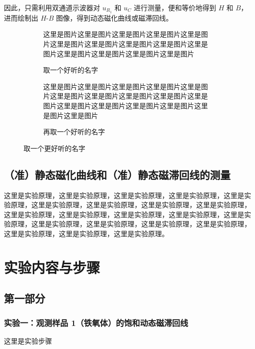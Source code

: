 \documentclass[UTF8]{article}
\theoremstyle{MyLineTheoremStyle} %
\theoremstyle{MyBlockTheoremStyle} %
\theoremstyle{MySubsubsectionStyle} %
\begin{document}
因此，只需利用双通道示波器对 $u_{R_1}$ 和 $u_C$ 进行测量，便和等价地得到 $H$ 和 $B$，进而绘制出 $H$-$B$ 图像，得到动态磁化曲线或磁滞回线。

\begin{figure}[H]\centering
\begin{subfigure}[b]{0.48\columnwidth}\centering
    这里是图片这里是图片这里是图片这里是图片这里是图片这里是图片这里是图片这里是图片这里是图片这里是图片这里是图片这里是图片这里是图片这里是图片
    \caption{取一个好听的名字}
\end{subfigure}\hfill
\begin{subfigure}[b]{0.48\columnwidth}\centering
    这里是图片这里是图片这里是图片这里是图片这里是图片这里是图片这里是图片这里是图片这里是图片这里是图片这里是图片这里是图片这里是图片这里是图片这里是图片这里是图片
    \caption{再取一个好听的名字}
\end{subfigure}
\caption{取一个更好听的名字}
\end{figure}



\subsection{（准）静态磁化曲线和（准）静态磁滞回线的测量}

这里是实验原理，这里是实验原理，这里是实验原理，这里是实验原理，这里是实验原理，这里是实验原理，这里是实验原理，这里是实验原理，这里是实验原理，这里是实验原理，这里是实验原理，这里是实验原理，这里是实验原理，这里是实验原理，这里是实验原理，这里是实验原理，这里是实验原理，这里是实验原理，这里是实验原理，这里是实验原理，这里是实验原理。


\section{实验内容与步骤}

\subsection{第一部分}

\subsubsection{实验一：观测样品 1（铁氧体）的饱和动态磁滞回线}

这里是实验步骤
\end{document}
